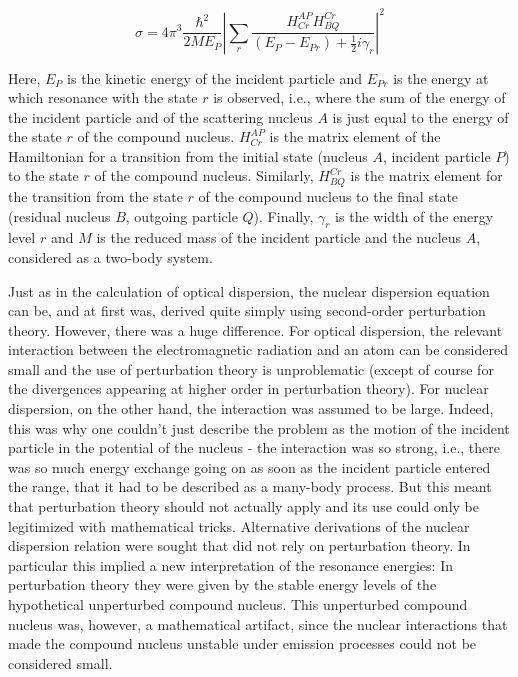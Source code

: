 \documentclass[12pt]{article}
\begin{document}
\begin{equation}
\sigma = 4 \pi^3 \frac{\hbar^2}{2 M E_P} \left\vert \sum_r \frac{H^{AP}_{Cr} H^{Cr}_{BQ}}{(E_P - E_{Pr}) + \frac{1}{2} i \gamma_r} \right\vert^2
\end{equation}

Here, $E_P$ is the kinetic energy of the incident particle and $E_{Pr}$ is the energy at which resonance with the state $r$ is observed, i.e., where the sum of the energy of the incident particle and of the scattering nucleus $A$ is just equal to the energy of the state $r$ of the compound nucleus. $H^{AP}_{Cr}$ is the matrix element of the Hamiltonian for a transition from the initial state (nucleus $A$, incident particle $P$) to the state $r$ of the compound nucleus. Similarly, $H^{Cr}_{BQ}$ is the matrix element for the transition from the state $r$ of the compound nucleus to the final state (residual nucleus $B$, outgoing particle $Q$). Finally, $\gamma_r$ is the width of the energy level $r$ and $M$ is the reduced mass of the incident particle and the nucleus $A$, considered as a two-body system.

Just as in the calculation of optical dispersion, the nuclear dispersion equation can be, and at first was, derived quite simply using second-order perturbation theory. However, there was a huge difference. For optical dispersion, the relevant interaction between the electromagnetic radiation and an atom can be considered small and the use of perturbation theory is unproblematic (except of course for the divergences appearing at higher order in perturbation theory). For nuclear dispersion, on the other hand, the interaction was assumed to be large. Indeed, this was why one couldn't just describe the problem as the motion of the incident particle in the potential of the nucleus - the interaction was so strong, i.e., there was so much energy exchange going on as soon as the incident particle entered the range, that it had to be described as a many-body process. But this meant that perturbation theory should not actually apply and its use could only be legitimized with mathematical tricks. Alternative derivations of the nuclear dispersion relation were sought that did not rely on perturbation theory. In particular this implied a new interpretation of the resonance energies: In perturbation theory they were given by the stable energy levels of the hypothetical unperturbed compound nucleus. This unperturbed compound nucleus was, however, a mathematical artifact, since the nuclear interactions that made the compound nucleus unstable under emission processes could not be considered small.
\end{document}
